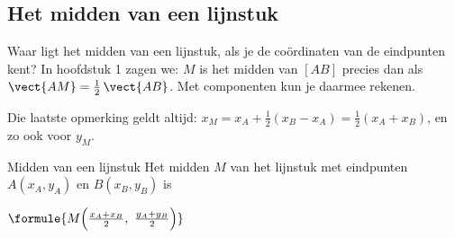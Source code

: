 \begin{oefeningen}
\end{oefeningen}

\subsection{Het midden van een lijnstuk}

Waar ligt het midden van een lijnstuk, als je de coördinaten van de eindpunten kent? In hoofdstuk 1 zagen we: $M$ is het midden van $[AB]$ precies dan als $\vect{AM} = \tfrac12\,\vect{AB}$. Met componenten kun je daarmee rekenen.


Die laatste opmerking geldt altijd: $x_M = x_A + \tfrac12(x_B - x_A) = \tfrac12(x_A + x_B)$, en zo ook voor $y_M$.

\begin{theorie}
\begin{stelling}{Midden van een lijnstuk}
Het midden $M$ van het lijnstuk met eindpunten $A(x_A, y_A)$ en $B(x_B, y_B)$ is

\vspace{1mm}
\qquad $\formule{M\Bigl(\frac{x_A + x_B}{2},\ \frac{y_A + y_B}{2}\Bigr)}$
\end{stelling}
\end{theorie}

\begin{oefeningen}
\end{oefeningen}

